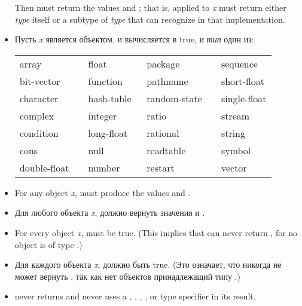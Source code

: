 \begin{defun}[Function]
\begin{new}
\begin{itemize}
Then
must return the values  and ; that is,  applied
to \emph{x} must return either \emph{type} itself or a subtype of \emph{type}
that  can recognize in that implementation.

\item
Пусть \emph{x} является объектом, и 
вычисляется в true, и \emph{тип} один из:

\begin{flushleft}
\cf
\begin{tabular}{@{}llll@{}}
array          & float        & package        & sequence \\
bit-vector     & function     & pathname       & short-float \\
character      & hash-table   & random-state~~ & single-float \\
complex        & integer      & ratio          & stream \\
condition      & long-float~~ & rational       & string \\
cons           & null         & readtable      & symbol \\
double-float~~ & number       & restart        & vector
\end{tabular}
\end{flushleft}

\item
For any object \emph{x}, 
must produce the values  and .

\item
Для любого объекта \emph{x}, 
должно вернуть значения  и .

\item
For every object \emph{x}, 
must be true.  (This implies that  can never return ,
for no object is of type .)

\item
Для каждого объекта \emph{x}, 
должно быть true. (Это означает, что  никогда не может вернуть
, так как нет объектов принадлежащий типу .)

\item
{} never returns  and never uses
a , , , ,
or  type specifier in its result.


\end{itemize}
\end{new}
\end{defun}
